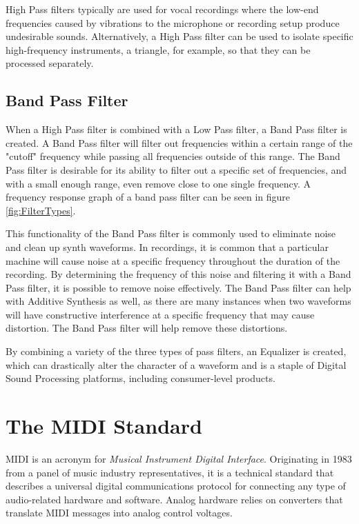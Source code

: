 \documentclass[a4paper,12pt]{report}
\begin{document}
High Pass filters typically are used for vocal recordings where the low-end frequencies caused by vibrations to the microphone or recording setup produce undesirable sounds. Alternatively, a High Pass filter can be used to isolate specific high-frequency instruments, a triangle, for example, so that they can be processed separately.

\subsection{Band Pass Filter}
\label{subsec:bandpassfilter}
When a High Pass filter is combined with a Low Pass filter, a Band Pass filter is created. A Band Pass filter will filter out frequencies within a certain range of the "cutoff" frequency while passing all frequencies outside of this range. The Band Pass filter is desirable for its ability to filter out a specific set of frequencies, and with a small enough range, even remove close to one single frequency. A frequency response graph of a band pass filter can be seen in figure \ref{fig:FilterTypes}.

This functionality of the Band Pass filter is commonly used to eliminate noise and clean up synth waveforms. In recordings, it is common that a particular machine will cause noise at a specific frequency throughout the duration of the recording. By determining the frequency of this noise and filtering it with a Band Pass filter, it is possible to remove noise effectively. The Band Pass filter can help with Additive Synthesis as well, as there are many instances when two waveforms will have constructive interference at a specific frequency that may cause distortion. The Band Pass filter will help remove these distortions.

By combining a variety of the three types of pass filters, an Equalizer is created, which can drastically alter the character of a waveform and is a staple of Digital Sound Processing platforms, including consumer-level products.


\section{The MIDI Standard}
\label{sec:midistandard}
MIDI \cite{midihome} is an acronym for \emph{Musical Instrument Digital Interface}. Originating in 1983 from a panel of music industry representatives, it is a technical standard that describes a universal digital communications protocol for connecting any type of audio-related hardware and software. Analog hardware relies on converters that translate MIDI messages into analog control voltages. 
\end{document}
